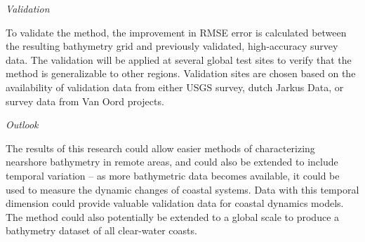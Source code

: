 \noindent\emph{Validation}

To validate the method, the improvement in RMSE error is calculated between the resulting bathymetry grid and previously validated, high-accuracy survey data. The validation will be applied at several global test sites to verify that the method is generalizable to other regions. Validation sites are chosen based on the availability of validation data from either USGS survey, dutch Jarkus Data, or survey data from Van Oord projects. 

\noindent\emph{Outlook} 

The results of this research could allow easier methods of characterizing nearshore bathymetry in remote areas, and could also be extended to include temporal variation – as more bathymetric data becomes available, it could be used to measure the dynamic changes of coastal systems. Data with this temporal dimension could provide valuable validation data for coastal dynamics models. The method could also potentially be extended to a global scale to produce a bathymetry dataset of all clear-water coasts.

